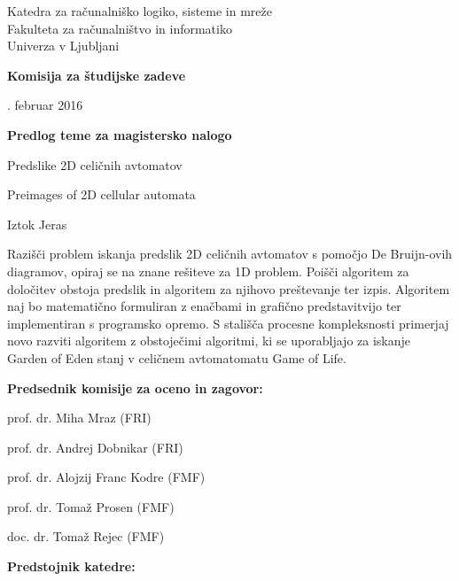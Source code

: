 \documentclass[a4paper, 12pt]{article}
\begin{document}
\noindent
Katedra za računalniško logiko, sisteme in mreže \\
Fakulteta za računalništvo in informatiko \\
Univerza v Ljubljani

\bigskip
{\bf Komisija za študijske zadeve}

. februar 2016

\bigskip
\begin{center}
{\Large\bf Predlog teme za magistersko nalogo}
\end{center}

\begin{description}[align=left,labelwidth=3cm,noitemsep,nolistsep]
\item [Naslov:]   Predslike 2D celičnih avtomatov
\item [Title:]    Preimages of 2D cellular automata
\\
\item [Kandidat:] Iztok Jeras
\\
\item [Tema naloge:] Razišči problem iskanja predslik 2D celičnih avtomatov
s pomočjo De Bruijn-ovih diagramov, opiraj se na znane rešiteve za 1D problem.
Poišči algoritem za določitev obstoja predslik in algoritem za njihovo preštevanje ter izpis.
Algoritem naj bo matematično formuliran z enačbami in grafično predstavitvijo
ter implementiran s programsko opremo.
S stališča procesne kompleksnosti primerjaj novo razviti algoritem z obstoječimi algoritmi,
ki se uporabljajo za iskanje Garden of Eden stanj v celičnem avtomatomatu Game of Life.
\end{description}

{\bf Predsednik komisije za oceno in zagovor:}
\begin{description}[align=left,labelwidth=4cm,noitemsep,nolistsep]
\item [Predsednik:] prof. dr. Miha Mraz (FRI)

\item [Člani:] prof. dr. Andrej Dobnikar (FRI)

\item [Predlagani člani:] prof. dr. Alojzij Franc Kodre (FMF)
\item []                  prof. dr. Tomaž Prosen (FMF)
\item []                  doc. dr. Tomaž Rejec (FMF)
\end{description}

\bigskip
{\bf Predstojnik katedre:}
\end{document}
